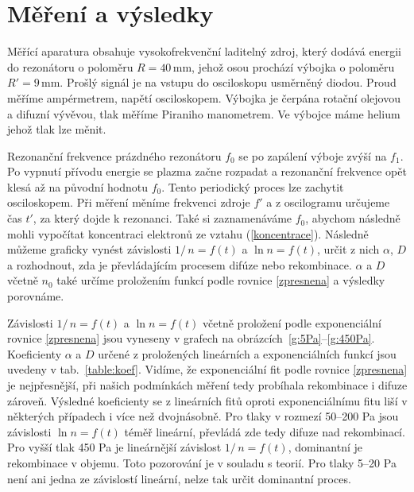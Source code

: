 \documentclass[a4paper,12pt]{article}
\begin{document}
\section{Měření a výsledky}
Měřící aparatura obsahuje vysokofrekvenční laditelný zdroj, který dodává energii do rezonátoru o poloměru $R = 40\,\si{\milli\meter}$, jehož osou prochází výbojka o poloměru $R' = 9\,\si{\milli\meter}$. Prošlý signál je na vstupu do osciloskopu usměrněný diodou. Proud měříme ampérmetrem, napětí osciloskopem. Výbojka je čerpána rotační olejovou a difuzní vývěvou, tlak měříme Piraniho manometrem. Ve výbojce máme helium jehož tlak lze měnit.

Rezonanční frekvence prázdného rezonátoru $f_0$ se po zapálení výboje zvýší na 
$f_1$. Po vypnutí přívodu energie se plazma začne rozpadat a rezonanční 
frekvence opět klesá až na původní hodnotu $f_0$. Tento periodický proces lze 
zachytit osciloskopem. Při měření měníme frekvenci zdroje $f'$ a z oscilogramu 
určujeme čas $t'$, za který dojde k rezonanci. Také si zaznamenáváme $f_0$, 
abychom následně mohli vypočítat koncentraci elektronů ze vztahu (\ref{koncentrace}). 
Následně můžeme graficky vynést závislosti $1/\,n = f(t)$ a $\ln n = f(t)$, 
určit z nich $\alpha$, $D$ a rozhodnout, zda je převládajícím procesem difúze 
nebo rekombinace. $\alpha$ a $D$ včetně $n_0$ také určíme proložením funkcí 
podle rovnice \eqref{zpresnena} a výsledky porovnáme.

Závislosti $1/\,n = f(t)$ a $\ln n = f(t)$ včetně proložení podle exponenciální rovnice 
\eqref{zpresnena} jsou vyneseny v grafech na obrázcích~\ref{g:5Pa}--\ref{g:450Pa}. 
Koeficienty $\alpha$ a $D$ určené z proložených lineárních a exponenciálních funkcí jsou 
uvedeny v tab.~\ref{table:koef}. Vidíme, že exponenciální fit podle rovnice \ref{zpresnena} je nejpřesnější, při našich podmínkách měření tedy probíhala rekombinace i difuze zároveň. Výsledné koeficienty se z lineárních fitů oproti exponenciálnímu fitu liší v některých případech i více než dvojnásobně. Pro tlaky v rozmezí 50--200 Pa jsou závislosti $\ln n = f(t)$ téměř lineární, převládá zde tedy difuze nad rekombinací. Pro vyšší tlak 450 Pa je lineárnější závislost $1/\,n = f(t)$, dominantní je rekombinace v objemu. Toto pozorování je v souladu s teorií. Pro tlaky 5--20 Pa není ani jedna ze závislostí lineární, nelze tak určit dominantní proces. 
\end{document}
